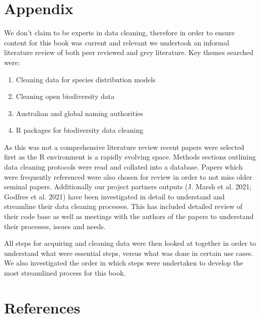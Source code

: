\documentclass[
  letterpaper,
  DIV=11,
  numbers=noendperiod,
  oneside]{scrreprt}
\begin{document}

\hypertarget{sec-appendix}{%
\chapter{Appendix}\label{sec-appendix}}

We don't claim to be experts in data cleaning, therefore in order to
ensure content for this book was current and relevant we undertook an
informal literature review of both peer reviewed and grey literature.
Key themes searched were:

\begin{enumerate}
\def\labelenumi{\arabic{enumi}.}
\item
  Cleaning data for species distribution models
\item
  Cleaning open biodiversity data
\item
  Australian and global naming authorities
\item
  R packages for biodiversity data cleaning
\end{enumerate}

As this was not a comprehensive literature review recent papers were
selected first as the R environment is a rapidly evolving space. Methods
sections outlining data cleaning protocols were read and collated into a
database. Papers which were frequently referenced were also chosen for
review in order to not miss older seminal papers. Additionally our
project partners outputs (J. Marsh et al. 2021; Godfree et al. 2021)
have been investigated in detail to understand and streamline their data
cleaning processes. This has included detailed review of their code base
as well as meetings with the authors of the papers to understand their
processes, issues and needs.

All steps for acquiring and cleaning data were then looked at together
in order to understand what were essential steps, versus what was done
in certain use cases. We also investigated the order in which steps were
undertaken to develop the most streamlined process for this book.


\hypertarget{sec-references}{%
\chapter{References}\label{sec-references}}
\end{document}
